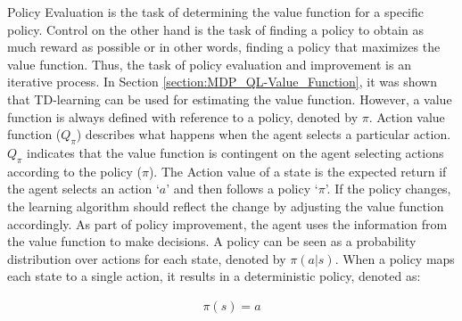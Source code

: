 Policy Evaluation is the task of determining the value function for a specific policy. Control on the other hand is the task of finding a policy to obtain as much reward as possible or in other words, finding a policy that maximizes the value function. Thus, the task of policy evaluation and improvement is an iterative process. In Section \ref{section:MDP_QL-Value_Function}, it was shown that TD-learning can be used for estimating the value function. However, a value function is always defined with reference to a policy, denoted by $\pi$. Action value function ($Q_{\pi}$) describes what happens when the agent selects a particular action. $Q_{\pi}$ indicates that the value function is contingent on the agent selecting actions according to the policy ($\pi$). The Action value of a state is the expected return if the agent selects an action `$a$' and then follows a policy `$\pi$'. If the policy changes, the learning algorithm should reflect the change by adjusting the value function accordingly. As part of policy improvement, the agent uses the information from the value function to make decisions. 
A policy can be seen as a probability distribution over actions for each state, denoted by $\pi(a|s)$. When a policy maps each state to a single action, it results in a deterministic policy, denoted as:

\begin{align}
    \pi(s) = a
\end{align}

